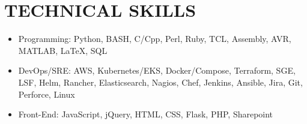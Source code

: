 \documentclass[line,margin]{res}
\begin{document}
\begin{resume}
\begin{adjustwidth}{-115pt}{0pt}

\end{adjustwidth}

\section{TECHNICAL SKILLS}
\vspace{25px}
\begin{adjustwidth}{-115pt}{0pt}
	\begin{itemize}
		\item Programming: Python, BASH, C/Cpp, Perl, Ruby, TCL, Assembly, AVR, MATLAB, \LaTeX, SQL
		\item DevOps/SRE: AWS, Kubernetes/EKS, Docker/Compose, Terraform, SGE, LSF, Helm, Rancher, Elasticsearch, Nagios, Chef, Jenkins, Ansible, Jira, Git, Perforce, Linux
		\item Front-End: JavaScript, jQuery, HTML, CSS, Flask, PHP, Sharepoint
	\end{itemize}
\end{adjustwidth}


\end{resume}
\end{document}
